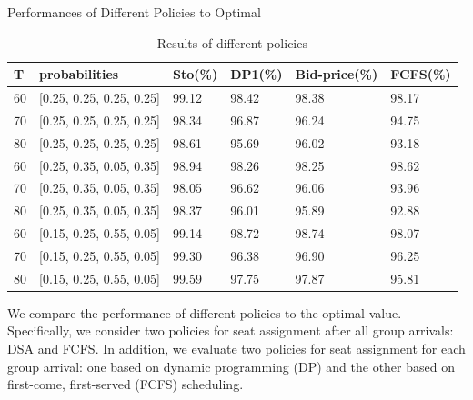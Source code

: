     \begin{frame}{Performances of Different Policies to Optimal}
        \scriptsize
        \begin{table}[ht]
          \centering
          \caption{Results of different policies}
          \begin{tabular}{|l|l|l|l|l|l|}
          \hline
           T & probabilities & Sto(\%) & DP1(\%) & Bid-price(\%) & FCFS(\%) \\
          \hline
           60  & [0.25, 0.25, 0.25, 0.25]  & 99.12 & 98.42 & 98.38 & 98.17 \\
           70  & [0.25, 0.25, 0.25, 0.25]  & 98.34 & 96.87 & 96.24 & 94.75 \\
           80  & [0.25, 0.25, 0.25, 0.25]  & 98.61 & 95.69 & 96.02 & 93.18 \\
           \hline
           60  & [0.25, 0.35, 0.05, 0.35]  & 98.94 & 98.26 & 98.25 & 98.62 \\
           70  & [0.25, 0.35, 0.05, 0.35]  & 98.05 & 96.62 & 96.06 & 93.96 \\
           80  & [0.25, 0.35, 0.05, 0.35]  & 98.37 & 96.01 & 95.89 & 92.88 \\
          \hline
          60  & [0.15, 0.25, 0.55, 0.05]  & 99.14 & 98.72 & 98.74 & 98.07 \\
          70  & [0.15, 0.25, 0.55, 0.05]  & 99.30 & 96.38 & 96.90 & 96.25 \\
          80  & [0.15, 0.25, 0.55, 0.05]  & 99.59 & 97.75 & 97.87 & 95.81 \\
          \hline
          \end{tabular}
        \end{table}

          We compare the performance of different policies to the optimal value. Specifically, we consider two policies for seat assignment after all group arrivals: DSA and FCFS. In addition, we evaluate two policies for seat assignment for each group arrival: one based on dynamic programming (DP) and the other based on first-come, first-served (FCFS) scheduling.
    \end{frame}
      
